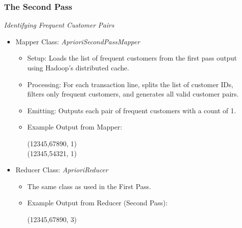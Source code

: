 \subsubsection{The Second Pass} \textit{Identifying Frequent Customer Pairs}

\begin{itemize}
    \item Mapper Class: \textit{AprioriSecondPassMapper}
    \begin{itemize}
        \item Setup: Loads the list of frequent customers from the first pass output using Hadoop’s distributed cache.
        \item Processing: For each transaction line, splits the list of customer IDs, filters only frequent customers, and generates all valid customer pairs.
        \item Emitting: Outputs each pair of frequent customers with a count of 1.
        \item Example Output from Mapper:
        \begin{center}
        (12345,67890, 1)\\
        (12345,54321, 1)
        \end{center}
    \end{itemize}

    \item Reducer Class: \textit{AprioriReducer}
    \begin{itemize}
        \item The same class as used in the First Pass.
        \item Example Output from Reducer (Second Pass):
        \begin{center}
        (12345,67890, 3)
        \end{center}
    \end{itemize}
\end{itemize}